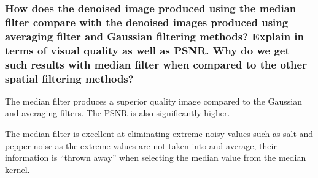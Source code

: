 \subsubsection{How does the denoised image produced using the median filter compare with the denoised images produced using averaging filter and Gaussian filtering methods? Explain in terms of visual quality as well as PSNR. Why do we get such results with median filter when compared to the other spatial filtering methods?}

The median filter produces a superior quality image compared to the Gaussian and averaging filters. The PSNR is also significantly higher.

The median filter is excellent at eliminating extreme noisy values such as salt and pepper noise as the extreme values are not taken into and average, their information is ``thrown away'' when selecting the median value from the median kernel.
